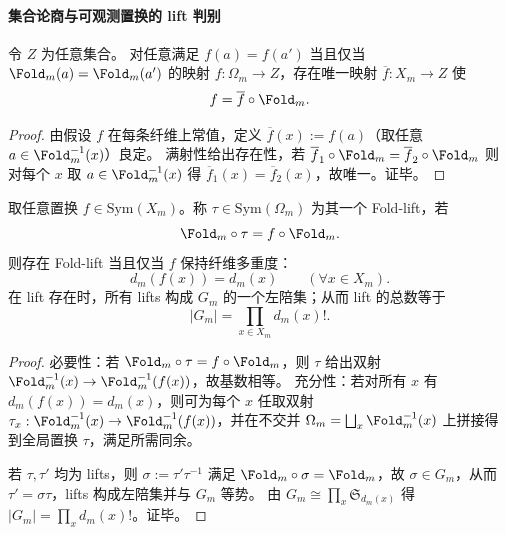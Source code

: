 \paragraph{集合论商与可观测置换的 lift 判别}
\begin{proposition}[折叠作为集合论商的泛性质]\label{prop:op-algebra-fold-quotient-universal}
令 \(Z\) 为任意集合。
对任意满足 \(f(a)=f(a')\) 当且仅当 \(\Fold_m(a)=\Fold_m(a')\) 的映射 \(f:\Omega_m\to Z\)，存在唯一映射 \(\overline f:X_m\to Z\) 使
\[
f=\overline f\circ \Fold_m.
\]
\end{proposition}
\begin{proof}
由假设 \(f\) 在每条纤维上常值，定义 \(\overline f(x):=f(a)\)（取任意 \(a\in\Fold_m^{-1}(x)\)）良定。
满射性给出存在性，若 \(\overline f_1\circ\Fold_m=\overline f_2\circ\Fold_m\) 则对每个 \(x\) 取 \(a\in\Fold_m^{-1}(x)\) 得 \(\overline f_1(x)=\overline f_2(x)\)，故唯一。证毕。
\end{proof}

\begin{proposition}\label{prop:op-algebra-fold-visible-permutation-lifts}
取任意置换 \(f\in\mathrm{Sym}(X_m)\)。称 \(\tau\in\mathrm{Sym}(\Omega_m)\) 为其一个 Fold-lift，若
\[
\Fold_m\circ\tau=f\circ\Fold_m.
\]
则存在 Fold-lift 当且仅当 \(f\) 保持纤维多重度：
\[
d_m(f(x))=d_m(x)\qquad(\forall x\in X_m).
\]
在 lift 存在时，所有 lifts 构成 \(G_m\) 的一个左陪集；从而 lift 的总数等于
\[
|G_m|=\prod_{x\in X_m} d_m(x)!.
\]
\end{proposition}
\begin{proof}
必要性：若 \(\Fold_m\circ\tau=f\circ\Fold_m\)，则 \(\tau\) 给出双射 \(\Fold_m^{-1}(x)\to\Fold_m^{-1}(f(x))\)，故基数相等。
充分性：若对所有 \(x\) 有 \(d_m(f(x))=d_m(x)\)，则可为每个 \(x\) 任取双射 \(\tau_x:\Fold_m^{-1}(x)\to\Fold_m^{-1}(f(x))\)，并在不交并 \(\Omega_m=\bigsqcup_x\Fold_m^{-1}(x)\) 上拼接得到全局置换 \(\tau\)，满足所需同余。
\par
若 \(\tau,\tau'\) 均为 lifts，则 \(\sigma:=\tau'\tau^{-1}\) 满足 \(\Fold_m\circ\sigma=\Fold_m\)，故 \(\sigma\in G_m\)，从而 \(\tau'=\sigma\tau\)，lifts 构成左陪集并与 \(G_m\) 等势。
由 \(G_m\cong\prod_x \mathfrak S_{d_m(x)}\) 得 \(|G_m|=\prod_x d_m(x)!\)。证毕。
\end{proof}



\endinput

